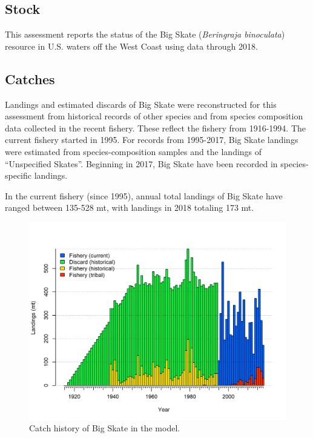 \documentclass[12pt,]{article}
\begin{document}
\hypertarget{stock}{%
\subsection*{Stock}\label{stock}}

This assessment reports the status of the Big Skate
(\emph{Beringraja binoculata}) resource in U.S. waters off the West
Coast using data through 2018.

\hypertarget{catches}{%
\subsection*{Catches}\label{catches}}

Landings and estimated discards of Big Skate were reconstructed for this
assessment from historical records of other species and from species
composition data collected in the recent fishery. These reflect the
fishery from 1916-1994. The current fishery started in 1995. For records
from 1995-2017, Big Skate landings were estimated from
species-composition samples and the landings of ``Unspecified Skates''.
Beginning in 2017, Big Skate have been recorded in species-specific
landings.

In the current fishery (since 1995), annual total landings of Big Skate
have ranged between 135-528 mt, with landings in 2018 totaling 173 mt.

\FloatBarrier

\FloatBarrier

\begin{figure}
\centering
\includegraphics{r4ss/plots_mod1/catch2 landings stacked.png}
\caption{Catch history of Big Skate in the model.
\label{fig:r4ss_catches}}
\end{figure}
\end{document}
